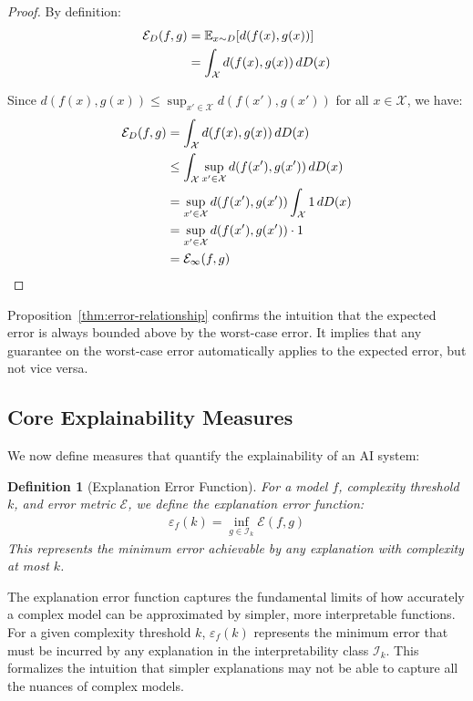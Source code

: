 \documentclass[11pt,letter,leqno]{article}
\newtheorem{definition}[theorem]{Definition}
\begin{document}
\begin{proof}
By definition:
\begin{align}
\mathcal{E}_D(f, g) &= \mathbb{E}_{x \sim D}[d(f(x), g(x))] \notag \\
&= \int_{\mathcal{X}} d(f(x), g(x)) \, dD(x)
\end{align}

Since $d(f(x), g(x)) \leq \sup_{x' \in \mathcal{X}} d(f(x'), g(x'))$ for all $x \in \mathcal{X}$, we have:
\begin{align*}
\mathcal{E}_D(f, g) &= \int_{\mathcal{X}} d(f(x), g(x)) \, dD(x) \\
&\leq \int_{\mathcal{X}} \sup_{x' \in \mathcal{X}} d(f(x'), g(x')) \, dD(x) \\
&= \sup_{x' \in \mathcal{X}} d(f(x'), g(x')) \int_{\mathcal{X}} 1 \, dD(x) \\
&= \sup_{x' \in \mathcal{X}} d(f(x'), g(x')) \cdot 1 \\
&= \mathcal{E}_{\infty}(f, g) \qedhere
\end{align*}
\end{proof}

Proposition~\ref{thm:error-relationship} confirms the intuition that the expected error is always bounded above by the worst-case error.  It implies that any guarantee on the worst-case error automatically applies to the expected error, but not vice versa.

\subsection{Core Explainability Measures}
\label{subsec:core-measures}

We now define measures that quantify the explainability of an AI system:

\begin{definition}[Explanation Error Function]
\label{def:error-function}
For a model $f$, complexity threshold $k$, and error metric $\mathcal{E}$, we define the explanation error function:
\begin{align}
\varepsilon_f(k) = \inf_{g \in \mathcal{I}_k} \mathcal{E}(f, g)
\end{align}
This represents the minimum error achievable by any explanation with complexity at most $k$.
\end{definition}

The explanation error function captures the fundamental limits of how accurately a complex model can be approximated by simpler, more interpretable functions.  For a given complexity threshold $k$, $\varepsilon_f(k)$ represents the minimum error that must be incurred by any explanation in the interpretability class $\mathcal{I}_k$.  This formalizes the intuition that simpler explanations may not be able to capture all the nuances of complex models.
\end{document}
